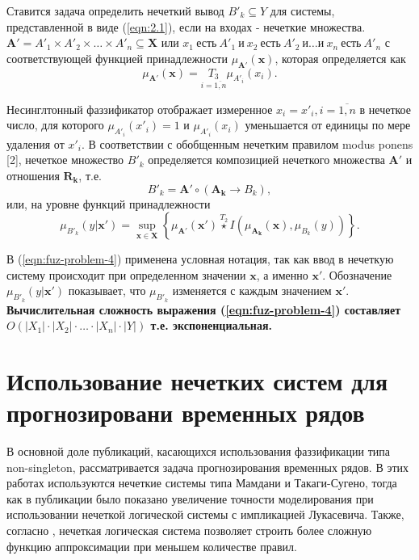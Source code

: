 Ставится задача определить нечеткий вывод $B'_k \subseteq Y$ для системы, представленной в виде (\ref{eqn:2.1}), если на входах - нечеткие множества.
$\mathbf{A'}=A'_1 \times A'_2 \times \dots \times A'_n \subseteq \mathbf{X}$ или $x_1\ \text{есть}\ A'_1\ \text{и}\ x_2\ \text{есть}\ A'_2\ \text{и} \dots \text{и}\ x_n\ \text{есть}\ A'_n$  с соответствующей функцией принадлежности $\mu_{\mathbf{A'}}(\mathbf{x})$, которая определяется как
\begin{equation}
	\label{eqn:fuz-problem-3}
	\mu_{\mathbf{A'}}(\mathbf{x}) = \underset{i=\overline{1,n}}{T_3} \mu_{A'_i}(x_i).
\end{equation}

Несинглтонный фаззификатор отображает измеренное $x_i=x'_i, i=\overline{1,n}$ в нечеткое число, для которого $\mu_{A'_i}(x'_i) = 1$ и $\mu_{A'_i}(x_i)$ уменьшается от единицы по мере удаления от  $x'_i$.
В соответствии с обобщенным нечетким правилом modus ponens [2], нечеткое множество $B'_k$ определяется композицией нечеткого множества $\mathbf{A'}$ и отношения $\mathbf{R_k}$, т.е.
\[
B'_k = \mathbf{A'} \circ (\mathbf{A_k} \to B_k),
\]
или, на уровне функций принадлежности
\begin{equation}
	\label{eqn:fuz-problem-4}
	\mu_{B'_k}(y|\mathbf{x'}) = \sup_{\mathbf{x}\in \mathbf{X}}\left\{\mu_{\mathbf{A'}}(\mathbf{x'})\overset{T_2}{\star} I(\mu_{\mathbf{A_k}}(\mathbf{x}), \mu_{B_k}(y))\right\}.
\end{equation}

В (\ref{eqn:fuz-problem-4}) применена условная нотация, так как ввод в нечеткую систему происходит при определенном значении $\mathbf{x}$, а именно $\mathbf{x'}$. Обозначение $\mu_{B'_k}(y | \mathbf{x'})$ показывает, что $\mu_{B'_k}$ изменяется с каждым значением $\mathbf{x'}$. \textbf{Вычислительная сложность выражения (\ref{eqn:fuz-problem-4}) составляет $O(|X_1|\cdot |X_2|\cdot \dots \cdot |X_n|\cdot |Y|)$ т.е. экспоненциальная.}

\section{Использование нечетких систем для прогнозировани временных рядов}

В основной доле публикаций, касающихся использования фаззификации типа non-singleton, рассматривается задача прогнозирования временных рядов. В этих работах используются нечеткие системы типа Мамдани и Такаги-Сугено, тогда как в публикации \cite{} было показано увеличение точности моделирования при использовании нечеткой логической системы с импликацией Лукасевича. Также, согласно , нечеткая логическая система позволяет строить более сложную функцию аппроксимации при меньшем количестве правил. 


